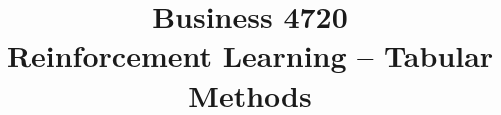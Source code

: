 \documentclass{article}
\title{Business 4720\\ \vspace{\baselineskip}
Reinforcement Learning -- Tabular Methods}
\begin{document}
\maketitle

\vfill

\clearpage


\end{document}
